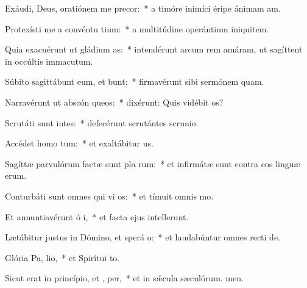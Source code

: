 \item Exáudi, Deus, oratiónem me  precor:~* a timóre inimíci éripe ánimam am.
\item Protexísti me a convéntu tium:~* a multitúdine operántium iniquitem.
\item Quia exacuérunt ut gládium  as:~* intendérunt arcum rem amáram, ut sagíttent in occúltis immacutum.
\item Súbito sagittábunt eum, et  bunt:~* firmavérunt sibi sermónem quam.
\item Narravérunt ut abscón queos:~* dixérunt: Quis vidébit os?
\item Scrutáti sunt intes:~* defecérunt scrutántes scrunio.
\item Accédet homo   tum:~* et exaltábitur us.
\item Sagíttæ parvulórum factæ sunt pla rum:~* et infirmátæ sunt contra eos linguæ erum.
\item Conturbáti sunt omnes qui vi os:~* et tímuit omnis mo.
\item Et annuntiavérunt ó i,~* et facta ejus intellerunt.
\item Lætábitur justus in Dómino, et sperá  o:~* et laudabúntur omnes recti de.
\item Glória Pa,  lio,~* et Spirítui to.
\item Sicut erat in princípio, et ,  per,~* et in sǽcula sæculórum. men.
